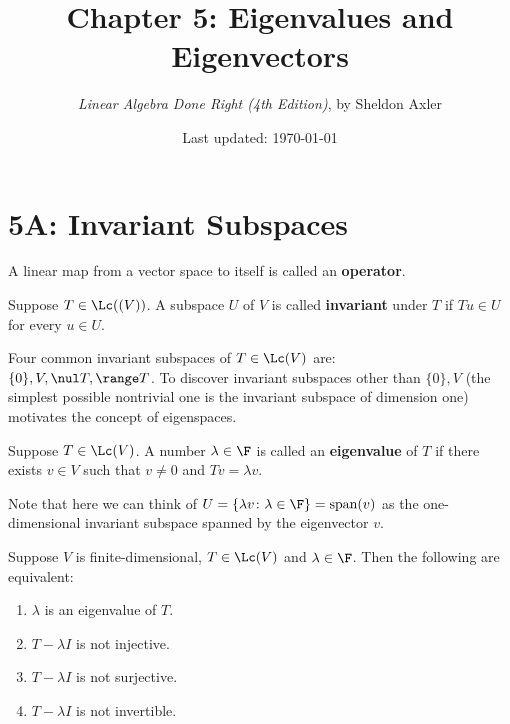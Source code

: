 \documentclass{extarticle}
\title{\vspace{-2em}Chapter 5: Eigenvalues and Eigenvectors}
\author{\emph{Linear Algebra Done Right (4th Edition)}, by Sheldon Axler}
\date{Last updated: \today}
\begin{document}
\maketitle 
\tableofcontents
\newpage 


\section*{5A: Invariant Subspaces}

\begin{definition}[operator]
    A linear map from a vector space to itself is called an \textbf{operator}. 
\end{definition}

\begin{definition}
    Suppose \(T \in \Lc((V))\). A subspace \(U\) of \(V\) is called \textbf{invariant}
    under \(T\) if \(Tu \in U\) for every \(u \in U\).
\end{definition}

\begin{remark}
    Four common invariant subspaces of \(T \in \Lc(V)\) are: \\ 
    \(\{0\}, V, \nul T, \range T\). To discover invariant subspaces 
    other than \(\{0\}, V\) (the simplest possible nontrivial 
    one is the invariant subspace of dimension one) 
    motivates the concept 
    of eigenspaces. 
\end{remark}

\begin{definition}[eigenvalue]
    Suppose \(T \in \Lc(V)\). A number \(\lambda \in \F\) is called an \textbf{eigenvalue}
    of \(T\) if there exists \(v \in V\) such that \(v \neq 0\) and \(Tv=\lambda v\). 
\end{definition}

\begin{remark}
    Note that here we can think of \(U = \{\lambda v \colon \lambda \in \F\} = \text{span}(v)\)
    as the one-dimensional invariant subspace spanned by the eigenvector \(v\). 
\end{remark}

\begin{lemma}
    Suppose \(V\) is finite-dimensional, \(T \in \Lc(V)\) and \(\lambda \in \F\). Then 
    the following are equivalent:
    \begin{enumerate}[label=(\alph*)]
        \item \(\lambda\) is an eigenvalue of \(T\).
        \item \(T - \lambda I\) is not injective. 
        \item \(T - \lambda I\) is not surjective. 
        \item \(T - \lambda I\) is not invertible. 
    \end{enumerate}
\end{lemma}
\end{document}
